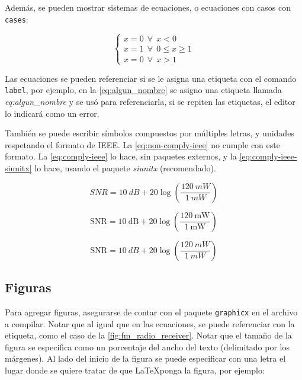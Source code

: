 Además, se pueden mostrar sistemas de ecuaciones, o ecuaciones con casos con \texttt{cases}:

\begin{equation}
    \begin{cases}
    x = 0 ~~ \forall ~~ x < 0\\
    x = 1 ~~ \forall ~~ 0 \leq x \geq 1 \\
    x = 0 ~~ \forall ~~ x > 1 
    \end{cases}
\end{equation}

Las ecuaciones se pueden referenciar si se le asigna una etiqueta con el comando \texttt{label}, por ejemplo, en la \autoref{eq:algun_nombre} se asigno una etiqueta llamada \textit{eq:algun\_nombre} y se usó para referenciarla, si se repiten las etiquetas, el editor lo indicará como un error.

También se puede escribir símbolos compuestos por múltiples letras, y unidades respetando el formato de IEEE. La \autoref{eq:non-comply-ieee} no cumple con este formato. La \autoref{eq:comply-ieee} lo hace, sin paquetes externos, y la \autoref{eq:comply-ieee-siunitx} lo hace, usando el paquete \textit{siunitx} (recomendado).

\begin{equation}
    SNR = 10~dB + 20\log\left(\frac{120~mW}{1~mW} \right)
    \label{eq:non-comply-ieee}
\end{equation}

\begin{equation}
    \mathrm{SNR} = 10~\text{dB} + 20 \log \left( \frac{120~\text{mW}}{1~\text{mW}} \right)
    \label{eq:comply-ieee}
\end{equation}

\begin{equation}
    \mathrm{SNR} = \qty{10}{dB} + 20 \log \left( \frac{\qty{120}{mW}}{\qty{1}{mW}} \right)
    \label{eq:comply-ieee-siunitx}
\end{equation}


\subsection{Figuras}

Para agregar figuras, asegurarse de contar con el paquete \texttt{graphicx} en el archivo a compilar. Notar que al igual que en las ecuaciones, se puede referenciar con la etiqueta, como el caso de la \autoref{fig:fm_radio_receiver}. Notar que el tamaño de la figura se especifica como un porcentaje del ancho del texto (delimitado por los márgenes). Al lado del inicio de la figura se puede especificar con una letra el lugar donde se quiere tratar de que \LaTeX ponga la figura, por ejemplo:


